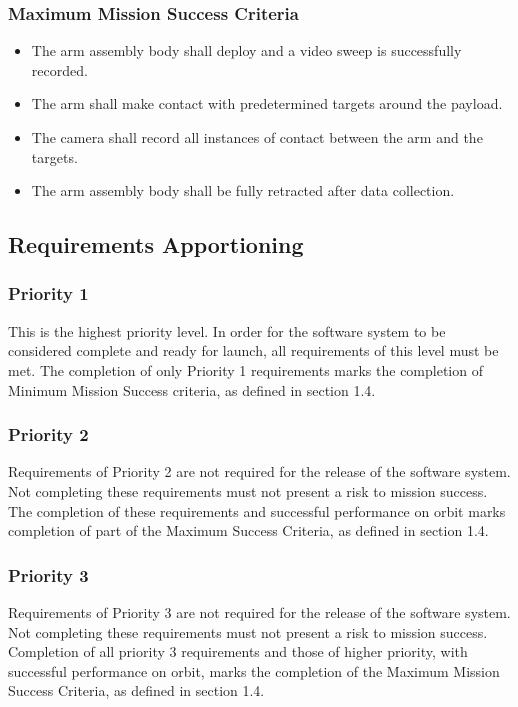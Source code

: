 \documentclass[letterpaper,10pt]{article}
\begin{document}
\subsubsection{Maximum Mission Success Criteria}
\begin{itemize}
\item{The arm assembly body shall deploy and a video sweep is successfully recorded.}
\item{The arm shall make contact with predetermined targets around the payload.}
\item{The camera shall record all instances of contact between the arm and the targets.}
\item{The arm assembly body shall be fully retracted after data collection.}
\end{itemize}

\subsection{Requirements Apportioning}

\subsubsection{Priority 1}
This is the highest priority level. In order for the software system to be considered complete and ready for launch, all requirements of this level must be met.
The completion of only Priority 1 requirements marks the completion of Minimum Mission Success criteria, as defined in section 1.4.

\subsubsection{Priority 2}
Requirements of Priority 2 are not required for the release of the software system.
Not completing these requirements must not present a risk to mission success.
The completion of these requirements and successful performance on orbit marks completion of part of the Maximum Success Criteria, as defined in section 1.4.

\subsubsection{Priority 3}
Requirements of Priority 3 are not required for the release of the software system.
Not completing these requirements must not present a risk to mission success.
Completion of all priority 3 requirements and those of higher priority, with successful performance on orbit, marks the completion of the Maximum Mission Success Criteria, as defined in section 1.4.
\end{document}
